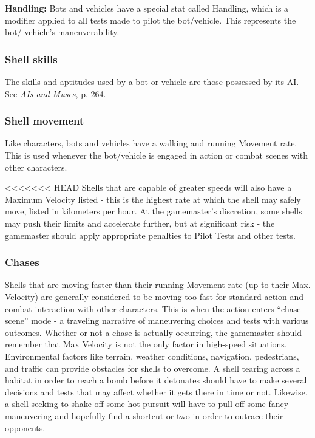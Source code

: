 \textbf{Handling:} Bots and vehicles have a special stat called Handling, which is a modifier applied to all tests made to pilot the bot/vehicle. This represents the bot/ vehicle’s maneuverability. 

\subsubsection{Shell skills} 

The skills and aptitudes used by a bot or vehicle are those possessed by its AI. See \emph{AIs and Muses}, p. 264. 

\subsubsection{Shell movement} 

Like characters, bots and vehicles have a walking and running Movement rate. This is used whenever the bot/vehicle is engaged in action or combat scenes with other characters. 

<<<<<<< HEAD Shells that are capable of greater speeds will also have a Maximum Velocity listed - this is the highest rate at which the shell may safely move, listed in kilometers per hour. At the gamemaster’s discretion, some shells may push their limits and accelerate further, but at significant risk - the gamemaster should apply appropriate penalties to Pilot Tests and other tests. 

\subsubsection{Chases} 

Shells that are moving faster than their running Movement rate (up to their Max. Velocity) are generally considered to be moving too fast for standard action and combat interaction with other characters. This is when the action enters ``chase scene'' mode - a traveling narrative of maneuvering choices and tests with various outcomes. Whether or not a chase is actually occurring, the gamemaster should remember that Max Velocity is not the only factor in high-speed situations. Environmental factors like terrain, weather conditions, navigation, pedestrians, and traffic can provide obstacles for shells to overcome. A shell tearing across a habitat in order to reach a bomb before it detonates should have to make several decisions and tests that may affect whether it gets there in time or not. Likewise, a shell seeking to shake off some hot pursuit will have to pull off some fancy maneuvering and hopefully find a shortcut or two in order to outrace their opponents. 

